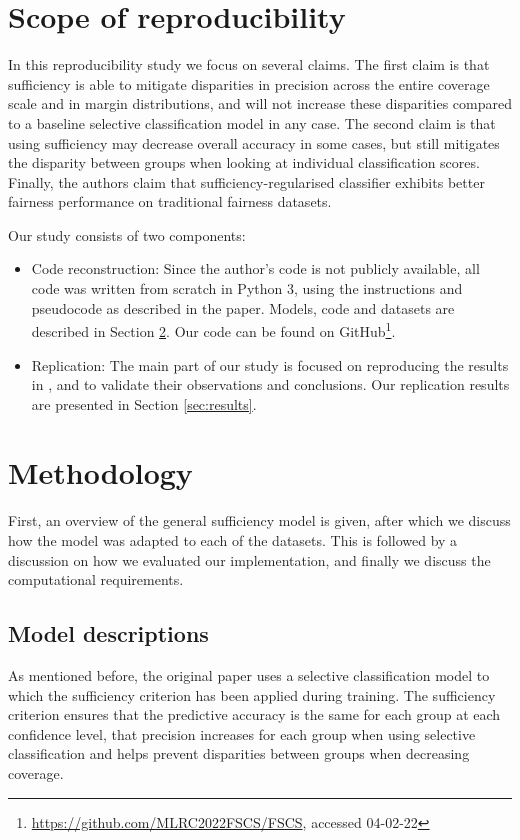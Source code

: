 \section{Scope of reproducibility}
\label{sec:claims}

In this reproducibility study we focus on several claims. The first claim is that sufficiency is able to mitigate disparities in precision across the entire coverage scale and in margin distributions, and will not increase these disparities compared to a baseline selective classification model in any case. The second claim is that  using sufficiency may decrease overall accuracy in some cases, but still mitigates the disparity between groups when looking at individual classification scores. Finally, the authors claim that sufficiency-regularised classifier exhibits better fairness performance on traditional fairness datasets.


Our study consists of two components:
\begin{itemize}
    \item Code reconstruction: Since the author's code is not publicly available, all code was written from scratch in Python 3, using the instructions and pseudocode as described in the paper. Models, code and datasets are described in Section \ref{sec:method}. Our code can be found on GitHub\footnote{\url{https://github.com/MLRC2022FSCS/FSCS}, accessed 04-02-22}.
    \item Replication: The main part of our study is focused on reproducing the results in \citet{lee2021fair}, and to validate their observations and conclusions. Our replication results are presented in Section \ref{sec:results}.
\end{itemize}

\section{Methodology}
\label{sec:method}

First, an overview of the general sufficiency model is given, after which we discuss how the model was adapted to each of the datasets. This is followed by a discussion on how we evaluated our implementation, and finally we discuss the computational requirements.

\subsection{Model descriptions}

As mentioned before, the original paper uses a selective classification model to which the sufficiency criterion has been applied during training. The sufficiency criterion ensures that the predictive accuracy is the same for each group at each confidence level, that precision increases for each group when using selective classification and helps prevent disparities between groups when decreasing coverage.

